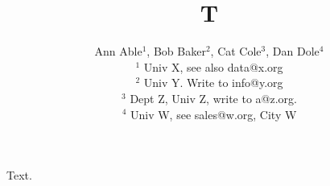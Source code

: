 \documentclass{article}
\begin{document}
\title{T}
\author{Ann Able$^1$, Bob Baker$^2$, Cat Cole$^3$, Dan Dole$^4$ \\
$^1$ Univ X, see also data@x.org \\
$^2$ Univ Y. Write to info@y.org \\
$^3$ Dept Z, Univ Z, write to a@z.org. \\
$^4$ Univ W, see sales@w.org, City W}
\maketitle
Text.
\end{document}
